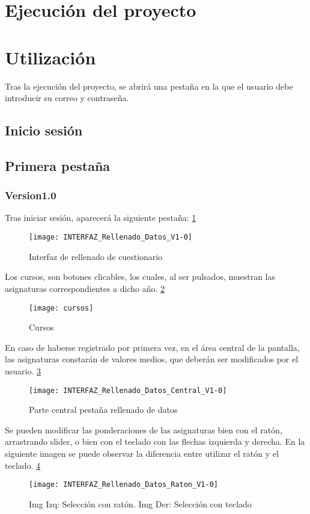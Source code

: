 \section{Ejecución del proyecto}


\section{Utilización}
Tras la ejecución del proyecto, se abrirá una pestaña en la que el usuario debe introducir su correo y contraseña. 
\subsection{Inicio sesión}



\subsection{Primera pestaña}
\subsubsection{Version1.0}
Tras iniciar sesión, aparecerá la siguiente pestaña: \ref{fig:E.2.1}
\begin{figure}[h]
\centering
\texttt{[image: INTERFAZ\_Rellenado\_Datos\_V1-0]}
\caption{Interfaz de rellenado de cuestionario}
\label{fig:E.2.1}
\end{figure}
Los cursos, son botones clicables, los cuales, al ser pulsados, muestran las asignaturas correspondientes a dicho año. \ref{fig:E.2.2}
\begin{figure}[h]
\centering
\texttt{[image: cursos]}
\caption{Cursos}
\label{fig:E.2.2}
\end{figure}

En caso de haberse registrado por primera vez, en el área central de la pantalla, las asignaturas constarán de valores medios, que deberán ser modificados por el usuario. \ref{fig:E.2.3}
\begin{figure}[h]
\centering
\texttt{[image: INTERFAZ\_Rellenado\_Datos\_Central\_V1-0]}
\caption{Parte central pestaña rellenado de datos}
\label{fig:E.2.3}
\end{figure}
Se pueden modificar las ponderaciones de las asignaturas bien con el ratón, arrastrando  slider, o bien con el teclado con las flechas izquierda y derecha. En la siguiente imagen se puede observar la diferencia entre utilizar el ratón y el teclado. \ref{fig:E.2.4}
\begin{figure}[h]
\centering
\texttt{[image: INTERFAZ\_Rellenado\_Datos\_Raton\_V1-0]}
\caption{Img Izq: Selección con ratón. Img Der: Selección con teclado}
\label{fig:E.2.4}
\end{figure}

